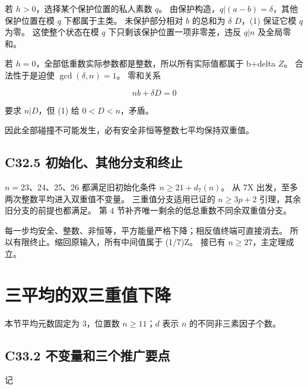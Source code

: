 {若} {\ensuremath{h>0}，选择某个保护位置的私人素数} {\ensuremath{q}。} {由保护构造，\ensuremath{q|(a-b)=\delta }，其他保护位置在模} {\ensuremath{q}} {下都属于主类。} {未保护部分相对} {\ensuremath{b}} {的总和为} {\ensuremath{\delta }} {\ensuremath{D}，(1)} {保证它模} {\ensuremath{q}} {为零。} {这使整个状态在模} {\ensuremath{q}} {下只剩该保护位置一项非零差，违反} {\ensuremath{q|n}} {及全局零和。}

{若} {\ensuremath{h=0}，全部低重数实际参数都是整数，所以所有实际值都属于} {b+delta} {\ensuremath{Z}。} {合法性于是迫使} {\ensuremath{\operatorname{gcd}(\delta ,n)=1}。} {零和关系}

\[
nb+\delta D=0
\]

{要求} {\ensuremath{n|D}，但} {(1)} {给} {\ensuremath{0<D<n}，矛盾。}

{因此全部碰撞不可能发生，必有安全非恒等整数七平均保持双重值。}

\subsection*{\texorpdfstring{{C32.5} {初始化、其他分支和终止}}{C32.5 初始化、其他分支和终止}}\label{C32-h211}

{\ensuremath{n=23}、24、25、26} {都满足旧初始化条件} {\ensuremath{n\ge 21+d_{7}(n)}。} {从} {7X} {出发，至多两次整数平均进入双重值不变量。} {三重值分支适用已证的} {\ensuremath{n\ge 3p+2}} {引理，其余旧分支的前提也都满足。} {第} {4} {节补齐唯一剩余的低总重数不同余双重值分支。}

{每一步均安全、整数、非恒等，平方能量严格下降；相反值终端可直接消去。} {所以有限终止。缩回原输入，所有中间值属于} {(1/7)Z。} {接已有} {\ensuremath{n\ge 27}，主定理成立。}


\section{三平均的双三重值下降}\label{construct:triple-tail}
{本节平均元数固定为} \(3\){，位置数} \(n\ge11\){；}\(d\) {表示} \(n\) {的不同非三素因子个数。}

\subsection*{\texorpdfstring{{C33.2} {不变量和三个推广要点}}{C33.2 不变量和三个推广要点}}\label{C33-h212}

{记}

